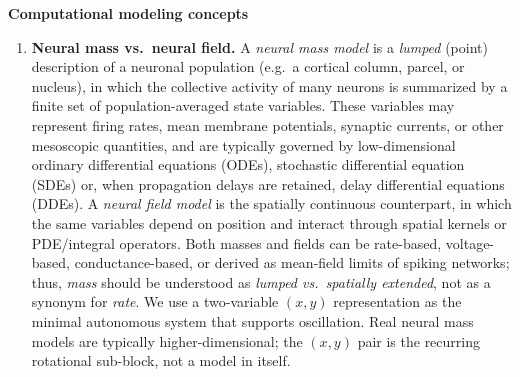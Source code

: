\documentclass[11pt]{article}
\numberwithin{equation}{section}
\newcommand{\rev}[1]{\begingroup\color{black}#1\endgroup}
\begin{document}
 
 \textbf{Computational modeling concepts} 
\begin{enumerate} 
\item  \rev{\textbf{Neural mass vs.\ neural field.}
A \emph{neural mass model} is a \emph{lumped} (point) description of a neuronal
population (e.g.\ a cortical column, parcel, or nucleus), in which the collective activity
of many neurons is summarized by a finite set of population-averaged state variables.
These variables may represent firing rates, mean membrane potentials, synaptic currents,
or other mesoscopic quantities, and are typically governed by low-dimensional ordinary differential equations (ODEs), stochastic differential equation (SDEs) or,
when propagation delays are retained,  delay differential equations (DDEs).
A \emph{neural field model} is the spatially continuous counterpart, in which the same
variables depend on position and interact through spatial kernels or PDE/integral operators.
Both masses and fields can be rate-based, voltage-based, conductance-based, or derived
as mean-field limits of spiking networks; thus, \emph{mass} should be understood as
\emph{lumped vs.\ spatially extended}, not as a synonym for \emph{rate}.
\smallskip
We use a two-variable $(x,y)$ representation as the minimal autonomous system that supports oscillation. Real neural mass models are typically higher-dimensional; the $(x,y)$ pair is the recurring rotational sub-block, not a model in itself.}


\end{enumerate}
\end{document}
